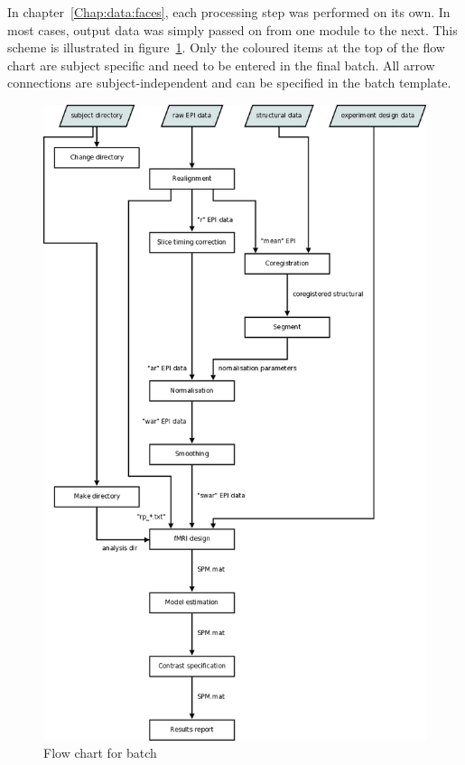 In chapter~\ref{Chap:data:faces}, each processing step was performed on its own. In
most cases, output data was simply passed on from one module to the next. This
scheme is illustrated in figure~\ref{fig:flow}. Only the coloured items at the
top of the flow chart are subject specific and need to be entered in the final
batch. All arrow connections are subject-independent and can be specified in
the batch template.

\begin{figure}
  \centering
  \includegraphics[height=.9\textheight]{batch/flow}
  \caption{Flow chart for batch}
  \label{fig:flow}
\end{figure}

